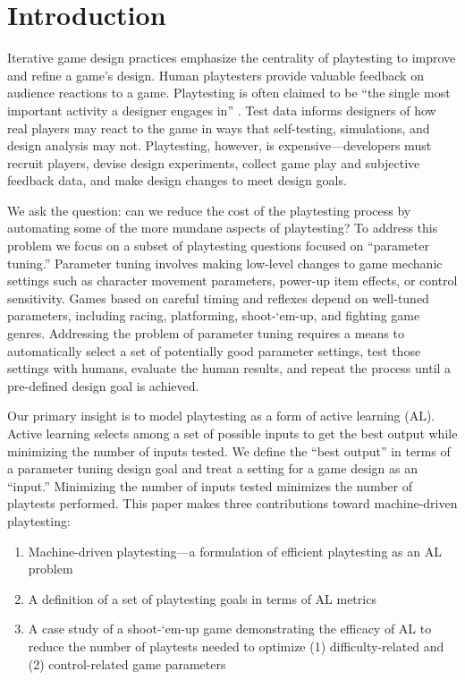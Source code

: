\documentclass{sig-alternate}
\begin{document}


\section{Introduction}



Iterative game design practices emphasize the centrality of playtesting to improve and refine a game's design.
Human playtesters provide valuable feedback on audience reactions to a game.
Playtesting is often claimed to be ``the single most important activity a designer engages in'' \cite{fullerton2008:playcentric}.
Test data informs designers of how real players may react to the game in ways that self-testing, simulations, and design analysis may not.
Playtesting, however, is expensive---developers must recruit players, devise design experiments, collect game play and subjective feedback data, and make design changes to meet design goals.


We ask the question: can we reduce the cost of the playtesting process by automating some of the more mundane aspects of playtesting?
To address this problem we focus on a subset of playtesting questions focused on ``parameter tuning.''
Parameter tuning involves making low-level changes to game mechanic settings such as character movement parameters, power-up item effects, or control sensitivity.
Games based on careful timing and reflexes depend on well-tuned parameters, including racing, platforming, shoot-`em-up, and fighting game genres.
Addressing the problem of parameter tuning requires a means to automatically select a set of potentially good parameter settings, test those settings with humans, evaluate the human results, and repeat the process until a pre-defined design goal is achieved.


Our primary insight is to model playtesting as a form of active learning (AL).
Active learning \cite{settles2012:al-book} selects among a set of possible inputs to get the best output while minimizing the number of inputs tested.
We define the ``best output'' in terms of a parameter tuning design goal and treat a setting for a game design as an ``input.''
Minimizing the number of inputs tested minimizes the number of playtests performed.
This paper makes three contributions toward machine-driven playtesting:
\begin{enumerate}
\item Machine-driven playtesting---a formulation of efficient playtesting as an AL problem %
\item A definition of a set of playtesting goals in terms of AL metrics
\item A case study of a shoot-`em-up game demonstrating the efficacy of AL to reduce the number of playtests needed to optimize (1) difficulty-related and (2) control-related game parameters
\end{enumerate}
\end{document}
